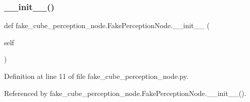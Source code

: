 \subsubsection{\texorpdfstring{\+\_\+\+\_\+init\+\_\+\+\_\+()}{\_\_init\_\_()}\hspace{0.1cm}{\footnotesize\ttfamily [1/2]}}
{\footnotesize\ttfamily def fake\+\_\+cube\+\_\+perception\+\_\+node.\+Fake\+Perception\+Node.\+\_\+\+\_\+init\+\_\+\+\_\+ (\begin{DoxyParamCaption}\item[{}]{self }\end{DoxyParamCaption})}



Definition at line 11 of file fake\+\_\+cube\+\_\+perception\+\_\+node.\+py.



Referenced by fake\+\_\+cube\+\_\+perception\+\_\+node.\+Fake\+Perception\+Node.\+\_\+\+\_\+init\+\_\+\+\_\+().


